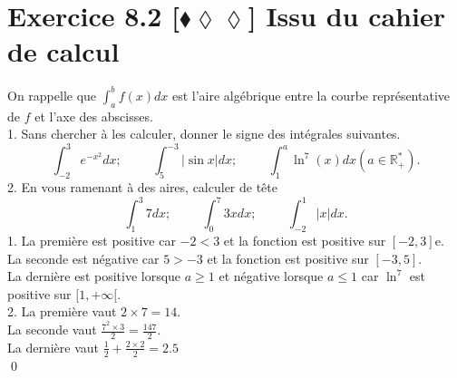 \documentclass[10pt]{article}
\begin{document}
\section*{Exercice 8.2 [$\blacklozenge\lozenge\lozenge$] Issu du cahier de calcul}
\begin{tcolorbox}[enhanced, width=7in, center, size=fbox, fontupper=\large, drop shadow southwest]
    On rappelle que $\int_a^b{f(x)dx}$ est l'aire algébrique entre la courbe représentative de $f$ et l'axe des abscisses.\\
    1. Sans chercher à les calculer, donner le signe des intégrales suivantes.
    \begin{equation*}
        \int_{-2}^3{e^{-x^2}dx}; \hspace{1cm} \int_5^{-3}{|\sin x|dx}; \hspace{1cm} \int_1^a{\ln^7(x)dx} (a\in\mathbb{R_+^*}).
    \end{equation*}
    2. En vous ramenant à des aires, calculer de tête
    \begin{equation*}
        \int_1^3{7dx}; \hspace{1cm} \int_0^7{3xdx}; \hspace{1cm} \int_{-2}^1{|x|dx}.
    \end{equation*}
    1. La première est positive car $-2<3$ et la fonction est positive sur $[-2,3]$e.\\
    La seconde est négative car $5>-3$ et la fonction est positive sur $[-3,5]$.\\
    La dernière est positive lorsque $a\geq1$ et négative lorsque $a\leq1$ car $\ln^7$ est positive sur $[1,+\infty[$.\\
    2. La première vaut $2\times7=14$.\\
    La seconde vaut $\frac{7^2\times3}{2}=\frac{147}{2}$.\\
    La dernière vaut $\frac{1}{2}+\frac{2\times2}{2}=2.5$\\
    \qed
\end{tcolorbox}

\end{document}

